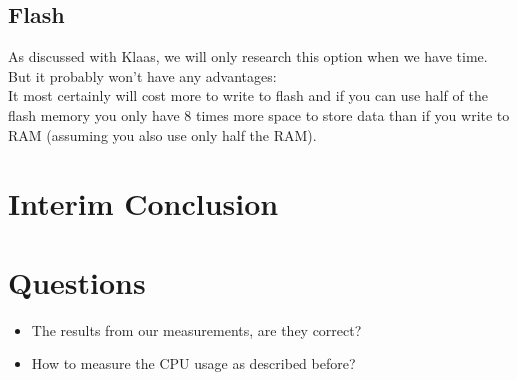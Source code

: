 \documentclass{article}
\begin{document}
\subsection{Flash}
As discussed with Klaas, we will only research this option when we have time. But it probably won't have any advantages:
\\
It most certainly will cost more to write to flash and if you can use half of the flash memory you only have 8 times more space to store data than if you write to RAM (assuming you also use only half the RAM).

\section{Interim Conclusion}


\section{Questions}
\begin{itemize}
\item The results from our measurements, are they correct?
\item How to measure the CPU usage as described before?
\end{itemize}
\end{document}
